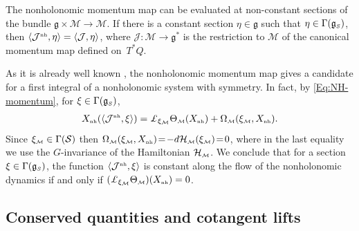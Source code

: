 \documentclass[pdftex]{sigma}
\numberwithin{equation}{section}
\def\M{\mathcal{M}}
\def\J{\mathcal{J}}
\def\S{\mathcal{S}}
\def\Ham{\mathcal{H}}
\def\g{\mathfrak{g}}
\def\nh{{\mbox{\tiny{nh}}}}
\def\subM{{\mbox{\tiny{$\M$}}}}
\def\subSS{{\mbox{\tiny{$S$}}}}
\begin{document}
\begin{Remark}
 The nonholonomic momentum map can be evaluated at non-constant sections
 of the bundle $\mathfrak{g}\times \M \to \M$.  If there is a constant section
 $\eta \in \mathfrak{g}$ such that $\eta \in \Gamma(\g_\subSS)$, then $\langle \J^{\nh} , \eta \rangle = \langle {\mathcal J} ,
 \eta \rangle $, where ${\mathcal J}\colon \M \to \mathfrak{g}^*$ is the restriction to $\M$
 of the canonical momentum map def\/ined on~$T^*Q$.
\end{Remark}

As it is already well known \cite{BGMConservation,Cortes,FSG2008}, the nonholonomic momentum
map gives a candidate for a f\/irst integral of a nonholonomic system with symmetry.
In fact, by \eqref{Eq:NH-momentum}, for $\xi\in\Gamma(\g_\subSS)$,
\begin{gather}\label{Eq:ConservedNHmom}
X_\nh(\langle {\mathcal J}^{\nh} , \xi  \rangle) = \pounds_{\xi_\M}  \Theta_\subM (X_\nh) + \Omega_\subM(\xi_\subM, X_\nh).
\end{gather}
Since $\xi_\subM\in \Gamma(\S)$ then $\Omega_\subM(\xi_\subM, X_\nh)\! =\!
- d\Ham_\subM (\xi_\subM)\! =\! 0$, where in the last equality we use the
$G$-in\-va\-riance of the Hamiltonian $\Ham_\subM$. We conclude that for
a section $\xi\in\Gamma(\g_\subSS)$, the function $\langle {\mathcal J}^{\nh} , \xi \rangle$
is constant along the f\/low of the nonholonomic dynamics if and only if
\mbox{$(\pounds_{\xi_\M}\Theta_\subM) (X_\nh)  = 0$}.

\subsection{Conserved quantities and cotangent lifts}\label{Ss:Cotangent}
\end{document}
